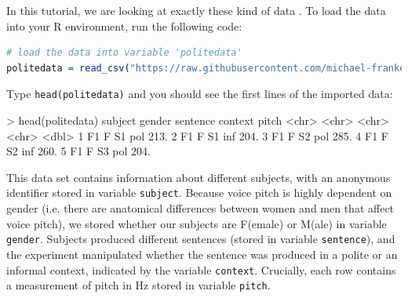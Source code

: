 \documentclass[nobib]{tufte-handout}
\newcommand{\ri}[1]{\lstinline{#1}}  %
\begin{document}
In this tutorial, we are looking at exactly these kind of data
\citep[following][]{Winter2013:Linear-models-a}. To load the data into your R environment,
run the following code:

\medskip


\begin{minipage}[]{\textwidth}
\begin{lstlisting}[language=R]
# load the data into variable 'politedata'
politedata = read_csv("https://raw.githubusercontent.com/michael-franke/bayes_mixed_regression_tutorial/master/code/politeness_data.csv")
\end{lstlisting}
\end{minipage}

\vspace*{-0.5cm}

\noindent Type \ri{head(politedata)} and you should see the first lines of the imported
data:

\medskip

\begin{minipage}[]{\textwidth}
\begin{rc}
> head(politedata)
   subject gender sentence context pitch
   <chr>   <chr>  <chr>    <chr>   <dbl>
 1 F1      F      S1       pol      213.
 2 F1      F      S1       inf      204.
 3 F1      F      S2       pol      285.
 4 F1      F      S2       inf      260.
 5 F1      F      S3       pol      204.
\end{rc}
\end{minipage}


\medskip

\noindent This data set contains information about different subjects, with an anonymous identifier stored in variable \texttt{subject}.
Because voice pitch is highly dependent on gender (i.e. there are anatomical differences between women and men that affect voice pitch), we stored whether our subjects are F(emale) or M(ale) in variable \texttt{gender}.
Subjects produced different sentences (stored in variable \texttt{sentence}), and the experiment manipulated whether the sentence was produced in a polite or an informal context, indicated by the variable \texttt{context}. Crucially, each row contains a measurement of pitch in Hz stored in variable \texttt{pitch}.
\end{document}
